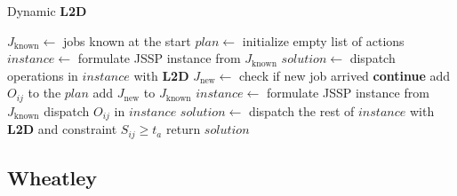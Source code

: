 \begin{algorithm}
	\caption{Dynamic \textbf{L2D}} \label{algorithm:l2d}
	\begin{algorithmic}[1]
	\State $J_\text{known} \gets$ jobs known at the start
    \State $plan \gets$ initialize empty list of actions 
    \State $instance \gets$ formulate JSSP instance from $J_\text{known}$
    \State $solution \gets$ dispatch operations in $instance$ with \textbf{L2D} 
        \State $J_\text{new} \gets$ check if new job arrived
            \State \textbf{continue}
        \EndIf
                \State add $O_{ij}$ to the $plan$
            \EndIf
		\EndFor
        \State add $J_\text{new}$ to $J_\text{known}$
        \State $instance \gets$ formulate JSSP instance from $J_\text{known}$
            \State dispatch $O_{ij}$ in $instance$
        \EndFor
        \State $solution \gets$ dispatch the rest of $instance$ with \textbf{L2D} and constraint $S_{ij} \geq t_a$ 
	\EndWhile
    \State return $solution$
\end{algorithmic}
\end{algorithm}

\subsection{Wheatley}

